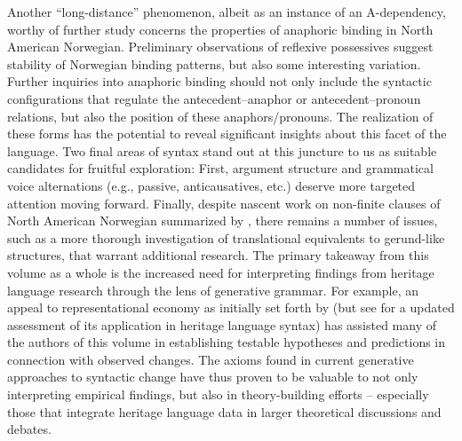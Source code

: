 \documentclass[output=paper,colorlinks,citecolor=brown]{langscibook}
\begin{document}
Another “long-distance” phenomenon, albeit as an instance of an A\hyp dependency, worthy of further study concerns the properties of anaphoric binding in North American Norwegian.  Preliminary observations of reflexive possessives  suggest stability of Norwegian binding patterns, but also some interesting variation. Further inquiries into anaphoric binding should not only include the syntactic configurations that regulate the antecedent--anaphor or antecedent--pronoun relations, but also the position of these anaphors\slash pronouns. The realization of these forms has the potential to reveal significant insights about this facet of the language. Two final areas of syntax stand out at this juncture to us as suitable candidates for fruitful exploration: First, argument structure and grammatical voice alternations (e.g., passive, anticausatives, etc.) deserve more targeted attention moving forward. Finally, despite nascent work on non-finite clauses of North American Norwegian summarized by , there remains a number of issues, such as a more thorough investigation of translational equivalents to gerund-like structures, that warrant additional research. The primary takeaway from this volume as a whole is the increased need for interpreting findings from heritage language research through the lens of generative grammar. For example, an appeal to representational economy as initially set forth by \citet{Scontras2018} (but see \citealt{Putnam2025} for a updated assessment of its application in heritage language syntax) has assisted many of the authors of this volume in establishing testable hypotheses and predictions in connection with observed changes. The axioms found in current generative approaches to syntactic change have thus proven to be valuable to not only interpreting empirical findings, but also in theory-building efforts -- especially those that integrate heritage language data in larger theoretical discussions and debates. 

\end{document}
